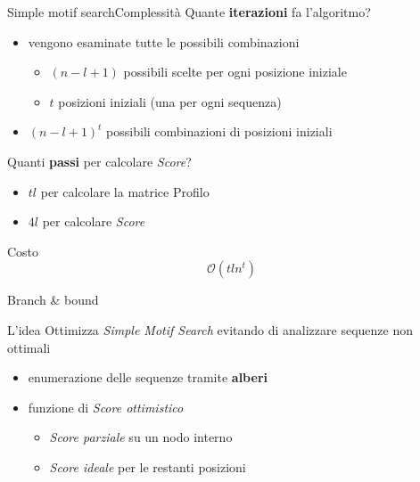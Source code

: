 	\begin{frame}{Simple motif search}{Complessità}
		Quante \alert{\textbf{iterazioni}} fa l'algoritmo?
		\pause
		\begin{flushleft}
			\begin{itemize}
				\item vengono esaminate tutte le possibili combinazioni
				\begin{itemize}
					\item $(n-l+1)$ possibili scelte per ogni posizione iniziale
					\item $t$ posizioni iniziali (una per ogni sequenza)
				\end{itemize}
				\pause
				\item $(n-l+1)^t$ possibili combinazioni di posizioni iniziali
			\end{itemize}
			\pause
		\end{flushleft}
		\begin{flushleft}
			Quanti \alert{\textbf{passi}} per calcolare \textit{Score}?
			\pause
			\begin{itemize}
				\item $tl$ per calcolare la matrice Profilo
				\pause
				\item $4l$ per calcolare \textit{Score}
			\end{itemize}
		\end{flushleft}
		\pause
		\begin{center}
			\begin{minipage}{3cm}
				\begin{block}{Costo}
					$$\mathcal{O}(tln^t)$$
				\end{block}
			\end{minipage}
		\end{center}
	\end{frame}
	
	\begin{frame}{Branch \& bound}
		\begin{block}{L'idea}
			Ottimizza \textit{Simple Motif Search} evitando di analizzare sequenze non ottimali
			\begin{itemize}
				\item enumerazione delle sequenze tramite \alert{\textbf{alberi}}
				\item funzione di \textit{Score ottimistico}
				\begin{itemize}
					\item \textit{Score parziale} su un nodo interno
					\item \textit{Score ideale} per le restanti posizioni
				\end{itemize}
			\end{itemize}
		\end{block}
	\end{frame}
	
